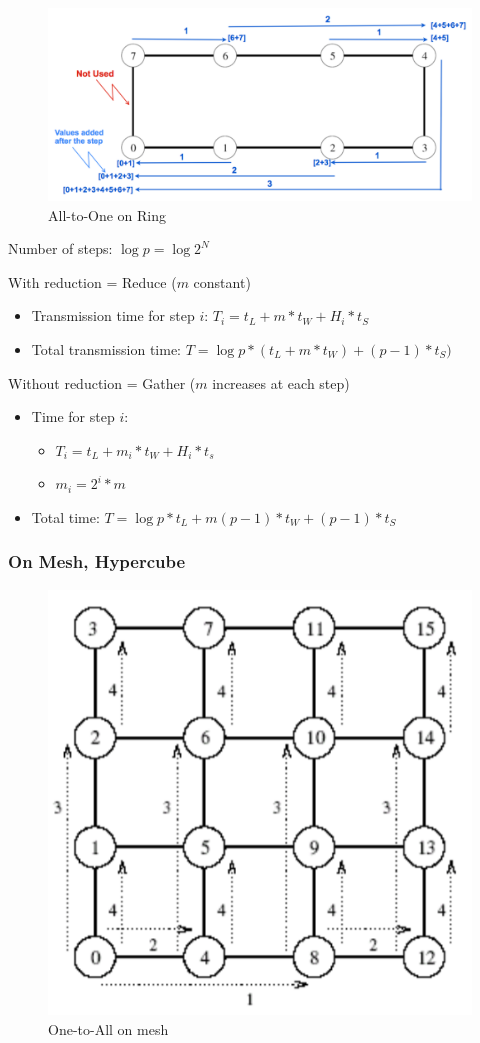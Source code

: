 \documentclass[11pt,a4paper]{report}
\begin{document}
\begin{figure}[H]
    \centering
    \includegraphics[width=0.7\linewidth]{img/comm_ring_all-to-one}
    \caption{All-to-One on Ring}
    \label{fig:commringall-to-one}
\end{figure}

Number of steps: $ \log{p} = \log{2^N} $

With reduction = Reduce ($m$ constant)

\begin{itemize}
    \item Transmission time for step $i$:
    $ T_{i} = t_{L} + m*t_{W} + H_{i} * t_{S} $
    
    \item Total transmission time:
    $ T = \log{p} * (t_{L} + m*t_{W}) + (p-1) * t_{S}) $
\end{itemize}

Without reduction = Gather ($m$ increases at each step)

\begin{itemize}
    \item Time for step $i$:
    \begin{itemize}
        \item $T_{i} = t_{L} + m_{i} * t_{W} + H_{i} * t_{s}$
        \item $m_{i} = 2^{i} * m$
    \end{itemize}
    \item Total time:
    $T=\log{p}*t_{L} + m(p-1)*t_{W} + (p-1) * t_{S}$
\end{itemize}

\subsubsection{On Mesh, Hypercube}

\begin{figure}[H]
\centering
\includegraphics[width=0.5\linewidth]{img/comm_mesh_one-to-all}
\caption{One-to-All on mesh}
\label{fig:commmeshone-to-all}
\end{figure}
\end{document}
